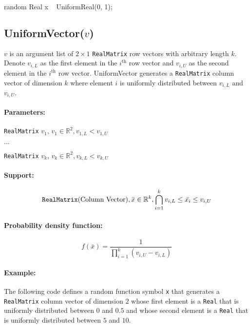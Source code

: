 \begin{blogcode}
random Real x ~ UniformReal(0, 1);
\end{blogcode}

\subsection{UniformVector($v$)}

$v$ is an argument list of $2 \times 1$ \verb|RealMatrix| row vectors with arbitrary length $k$. Denote $v_{i,L}$ as the first element in the $i^{\text{th}}$ row vector and $v_{i, U}$ as the second element in the $i^{\text{th}}$ row vector. UniformVector generates a \verb|RealMatrix| column vector of dimension $k$ where element $i$ is uniformly distributed between $v_{i,L}$ and $v_{i,U}$.

\paragraph*{Parameters:} 
\begin{itemize*}
\item[] \verb|RealMatrix| $v_{1}$, $v_{1} \in \mathbb{R}^{2}, v_{1,L} < v_{1,U}$
\item[] $\ldots$
\item[] \verb|RealMatrix| $v_{k}$, $v_{k} \in \mathbb{R}^{2}, 
v_{k,L} < v_{k,U}$

\end{itemize*}

\paragraph*{Support:} 
$$
\verb|RealMatrix| \text{(Column Vector)}, 
\bar{x} \in \mathbb{R}^{k}, \bigcap_{i=1}^{k} v_{i,L} \leq \bar{x_{i}} \leq v_{i,U}  
$$

\paragraph*{Probability density function:}
\[
	f(\bar{x}) = \frac{1}{\prod_{i=1}^{k} (v_{i,U} - v_{i,L})}
\]

\paragraph*{Example:}
The following code defines a random function symbol \verb|x| that generates a \verb|RealMatrix| column vector of dimension $2$ whose first element is a \verb|Real| that is uniformly distributed between $0$ and $0.5$ and whose second element is a \verb|Real| that is uniformly distributed between $5$ and $10$.

